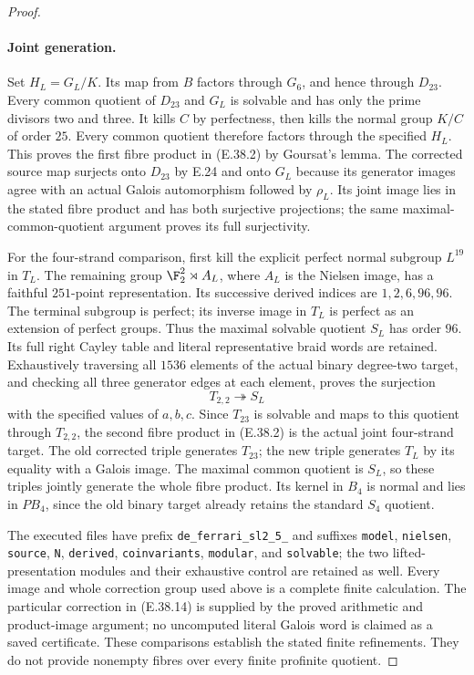 \begin{proof}
\paragraph{Joint generation.}
Set $H_L=G_L/K$.  Its map from $B$ factors
through $G_6$, and hence through $D_{23}$.
Every common quotient of $D_{23}$ and
$G_L$ is solvable and has only the prime
divisors two and three.  It kills $C$ by
perfectness, then kills the normal group
$K/C$ of order $25$.  Every common quotient
therefore factors through the specified
$H_L$.  This proves the first fibre product
in \textup{(E.38.2)} by Goursat's lemma.
The corrected source map surjects onto
$D_{23}$ by E.24 and onto $G_L$ because
its generator images agree with an actual
Galois automorphism followed by $\rho_L$.
Its joint image lies in the stated fibre
product and has both surjective projections;
the same maximal-common-quotient argument
proves its full surjectivity.

For the four-strand comparison, first kill
the explicit perfect normal subgroup
$L^{19}$ in $T_L$.  The remaining group
$\F_2^2\rtimes A_L$, where $A_L$ is the
Nielsen image, has a faithful $251$-point
representation.  Its successive derived
indices are $1,2,6,96,96$.  The terminal
subgroup is perfect; its inverse image in
$T_L$ is perfect as an extension of perfect
groups.  Thus the maximal solvable quotient
$S_L$ has order $96$.
Its full right Cayley table and literal
representative braid words are retained.
Exhaustively traversing all $1536$ elements
of the actual binary degree-two target,
and checking all three generator edges
at each element, proves the surjection
\[
                   T_{2,2}\twoheadrightarrow S_L
 \tag{E.38.15}
\]
with the specified values of $a,b,c$.
Since $T_{23}$ is solvable and maps to
this quotient through $T_{2,2}$, the second
fibre product in \textup{(E.38.2)} is the
actual joint four-strand target.  The old
corrected triple generates $T_{23}$; the
new triple generates $T_L$ by its equality
with a Galois image.  The maximal common
quotient is $S_L$, so these triples jointly
generate the whole fibre product.  Its
kernel in $B_4$ is normal and lies in
$PB_4$, since the old binary target
already retains the standard $S_4$ quotient.

The executed files have prefix
\texttt{de\_ferrari\_sl2\_5\_} and suffixes
\texttt{model}, \texttt{nielsen}, \texttt{source},
\texttt{N}, \texttt{derived}, \texttt{coinvariants},
\texttt{modular}, and \texttt{solvable}; the
two lifted-presentation modules and their
exhaustive control are retained as well.
Every image and whole correction group
used above is a complete finite calculation.
The particular correction in
\textup{(E.38.14)} is supplied by the
proved arithmetic and product-image
argument; no uncomputed literal Galois
word is claimed as a saved certificate.
These comparisons establish the stated
finite refinements.  They do not provide
nonempty fibres over every finite
profinite quotient.
\end{proof}
